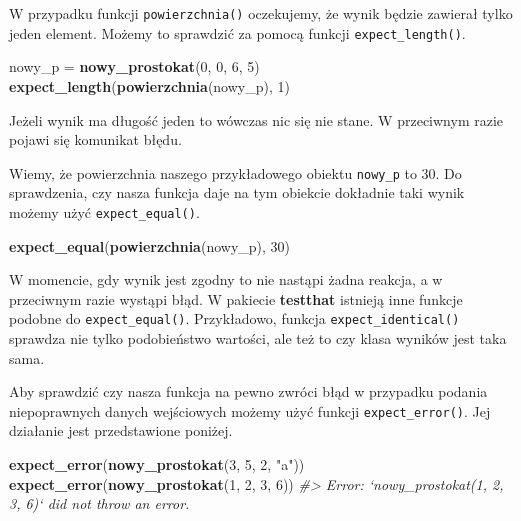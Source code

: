 \documentclass[paper=6in:9in,pagesize=pdftex,headinclude=on,footinclude=on,10pt]{scrbook}
\newenvironment{Shaded}{\begin{snugshade}}{\end{snugshade}}
\newcommand{\CommentTok}[1]{\textcolor[rgb]{0.56,0.35,0.01}{\textit{#1}}}
\newcommand{\DecValTok}[1]{\textcolor[rgb]{0.00,0.00,0.81}{#1}}
\newcommand{\KeywordTok}[1]{\textcolor[rgb]{0.13,0.29,0.53}{\textbf{#1}}}
\newcommand{\NormalTok}[1]{#1}
\newcommand{\StringTok}[1]{\textcolor[rgb]{0.31,0.60,0.02}{#1}}
\begin{document}
W przypadku funkcji \texttt{powierzchnia()} oczekujemy, że wynik będzie zawierał tylko jeden element.
Możemy to sprawdzić za pomocą funkcji \texttt{expect\_length()}.

\begin{Shaded}
\begin{Highlighting}[]
\NormalTok{nowy_p =}\StringTok{ }\KeywordTok{nowy_prostokat}\NormalTok{(}\DecValTok{0}\NormalTok{, }\DecValTok{0}\NormalTok{, }\DecValTok{6}\NormalTok{, }\DecValTok{5}\NormalTok{)}
\KeywordTok{expect_length}\NormalTok{(}\KeywordTok{powierzchnia}\NormalTok{(nowy_p), }\DecValTok{1}\NormalTok{)}
\end{Highlighting}
\end{Shaded}

Jeżeli wynik ma długość jeden to wówczas nic się nie stane.
W przeciwnym razie pojawi się komunikat błędu.

Wiemy, że powierzchnia naszego przykładowego obiektu \texttt{nowy\_p} to 30.
Do sprawdzenia, czy nasza funkcja daje na tym obiekcie dokładnie taki wynik możemy użyć \texttt{expect\_equal()}.

\begin{Shaded}
\begin{Highlighting}[]
\KeywordTok{expect_equal}\NormalTok{(}\KeywordTok{powierzchnia}\NormalTok{(nowy_p), }\DecValTok{30}\NormalTok{)}
\end{Highlighting}
\end{Shaded}

W momencie, gdy wynik jest zgodny to nie nastąpi żadna reakcja, a w przeciwnym razie wystąpi błąd.
W pakiecie \textbf{testthat} istnieją inne funkcje podobne do \texttt{expect\_equal()}.
Przykładowo, funkcja \texttt{expect\_identical()} sprawdza nie tylko podobieństwo wartości, ale też to czy klasa wyników jest taka sama.

Aby sprawdzić czy nasza funkcja na pewno zwróci błąd w przypadku podania niepoprawnych danych wejściowych możemy użyć funkcji \texttt{expect\_error()}.
Jej działanie jest przedstawione poniżej.

\begin{Shaded}
\begin{Highlighting}[]
\KeywordTok{expect_error}\NormalTok{(}\KeywordTok{nowy_prostokat}\NormalTok{(}\DecValTok{3}\NormalTok{, }\DecValTok{5}\NormalTok{, }\DecValTok{2}\NormalTok{, }\StringTok{"a"}\NormalTok{))}
\KeywordTok{expect_error}\NormalTok{(}\KeywordTok{nowy_prostokat}\NormalTok{(}\DecValTok{1}\NormalTok{, }\DecValTok{2}\NormalTok{, }\DecValTok{3}\NormalTok{, }\DecValTok{6}\NormalTok{))}
\CommentTok{#> Error: `nowy_prostokat(1, 2, 3, 6)` did not throw an error.}
\end{Highlighting}
\end{Shaded}
\end{document}
